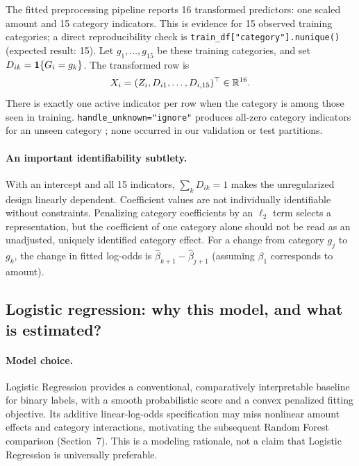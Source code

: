 \documentclass[11pt,a4paper]{article}
\begin{document}
The fitted preprocessing pipeline reports 16 transformed predictors: one scaled amount and 15 category indicators. This is evidence for 15 observed training categories; a direct reproducibility check is \texttt{train\_df["category"].nunique()} (expected result: 15). Let $g_1,\ldots,g_{15}$ be these training categories, and set $D_{ik}=\mathbf 1\{G_i=g_k\}$. The transformed row is
\begin{equation}\label{eq:design}X_i=(Z_i,D_{i1},\ldots,D_{i,15})^\top\in\mathbb R^{16}.\end{equation}
There is exactly one active indicator per row when the category is among those seen in training. \texttt{handle\_unknown="ignore"} produces all-zero category indicators for an unseen category \cite{skonehot}; none occurred in our validation or test partitions.

\paragraph{An important identifiability subtlety.} With an intercept and all 15 indicators, $\sum_k D_{ik}=1$ makes the unregularized design linearly dependent. Coefficient values are not individually identifiable without constraints. Penalizing category coefficients by an $\ell_2$ term selects a representation, but the coefficient of one category alone should not be read as an unadjusted, uniquely identified category effect. For a change from category $g_j$ to $g_k$, the change in fitted log-odds is $\hat\beta_{k+1}-\hat\beta_{j+1}$ (assuming $\beta_1$ corresponds to amount).

\subsection{Logistic regression: why this model, and what is estimated?}
\paragraph{Model choice.} Logistic Regression provides a conventional, comparatively interpretable baseline for binary labels, with a smooth probabilistic score and a convex penalized fitting objective. Its additive linear-log-odds specification may miss nonlinear amount effects and category interactions, motivating the subsequent Random Forest comparison (Section~7). This is a modeling rationale, not a claim that Logistic Regression is universally preferable.
\end{document}
